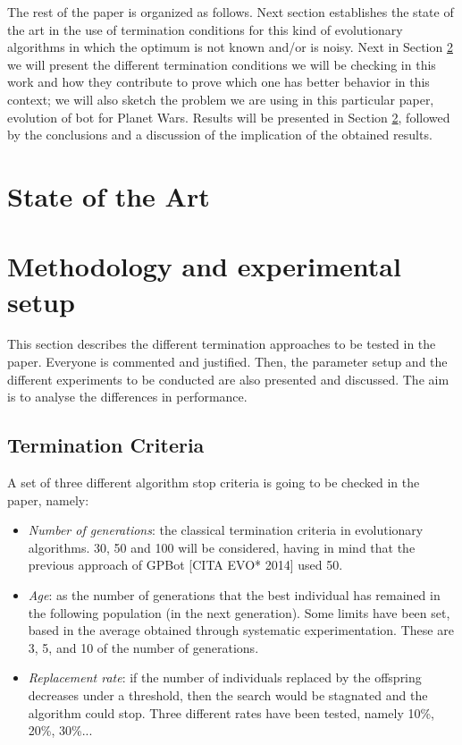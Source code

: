\documentclass[runningheads,a4paper]{llncs}
\begin{document}
The rest of the paper is organized as follows. Next section
establishes the state of the art in the use of termination conditions
for this kind of evolutionary algorithms in which the optimum is not
known and/or is noisy. Next in Section \ref{sec:met} we will present the different termination
conditions we will be checking in this work and how they contribute to
prove which one has better behavior in this context; we will also
sketch the problem we are using in this particular paper, evolution of
bot for Planet Wars. Results will be presented in Section
\ref{sec:met}, followed by the conclusions and a discussion of the
implication of the obtained results.

\section{State of the Art}

\section{Methodology and experimental setup}
\label{sec:met}

This section describes the different termination approaches to be tested in the paper. Everyone is commented and justified.
Then, the parameter setup and the different experiments to be conducted are also presented and discussed. The aim is to analyse the differences in performance.

\subsection{Termination Criteria}
A set of three different algorithm stop criteria is going to be checked in the paper, namely:
\begin{itemize}
    \item \textit{Number of generations}: the classical termination criteria in evolutionary algorithms. 30, 50 and 100 will be considered, having in mind that the previous approach of GPBot [CITA EVO* 2014] used 50.
    \item \textit{Age}: as the number of generations that the best individual has remained in the following population (in the next generation). Some limits have been set, based in the average obtained through systematic experimentation. These are 3, 5, and 10 of the number of generations.
    \item \textit{Replacement rate}: if the number of individuals replaced by the offspring decreases under a threshold, then the search would be stagnated and the algorithm could stop. Three different rates have been tested, namely 10\%, 20\%, 30\%...
\end{itemize}
\end{document}
